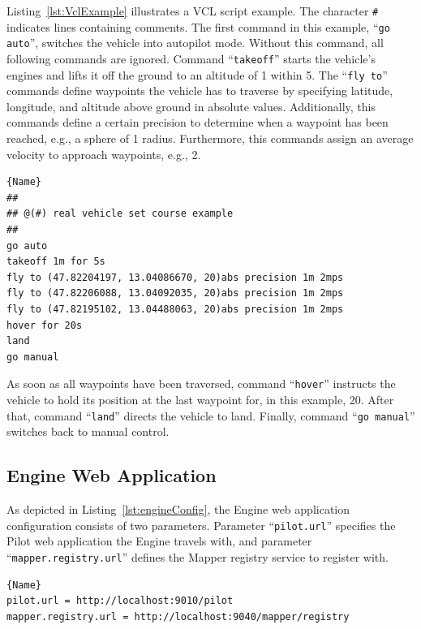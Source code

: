 Listing~\ref{lst:VclExample} illustrates a \ac{VCL} script example. 
The character \texttt{\#} indicates lines containing comments.
%
The first command in this example, ``\texttt{go auto}'', switches the vehicle into autopilot mode. Without
this command, all following commands are ignored. Command ``\texttt{takeoff}'' starts the vehicle's engines
and lifts it off the ground to an altitude of \unit{1}{\meter} within \unit{5}{\second}.
%
The ``\texttt{fly to}'' commands define waypoints the vehicle has to traverse by specifying latitude, longitude,
and altitude above ground in absolute values. Additionally, this commands define a certain precision to
determine when a waypoint has been reached, e.g., a sphere of \unit{1}{\meter} radius. Furthermore, this commands
assign an average velocity to approach waypoints, e.g., \unit{2}{\meter\per\second}.
% 
\lstset{tabsize=3,language=Tex}
\begin{lstlisting}[caption={Vehicle Control Language Example},mathescape=true,label=lst:VclExample]{Name}
##
## @(#) real vehicle set course example
##
go auto
takeoff 1m for 5s
fly to (47.82204197, 13.04086670, 20)abs precision 1m 2mps
fly to (47.82206088, 13.04092035, 20)abs precision 1m 2mps
fly to (47.82195102, 13.04488063, 20)abs precision 1m 2mps
hover for 20s
land
go manual
\end{lstlisting}
%
As soon as all waypoints have been traversed, command ``\texttt{hover}'' instructs the vehicle to hold its
position at the last waypoint for, in this example, \unit{20}{\second}. After that, command ``\texttt{land}''
directs the vehicle to land. Finally, command ``\texttt{go manual}'' switches back to manual control.


\subsection{Engine Web Application}

As depicted in Listing~\ref{lst:engineConfig}, the Engine web application configuration consists
of two parameters. Parameter ``\texttt{pilot.url}'' specifies the Pilot web application the Engine
travels with, and parameter ``\texttt{mapper.registry.url}'' defines the Mapper registry service to
register with.
\lstset{tabsize=3,language=Tex}
\begin{lstlisting}[caption={Engine Configuration Example},mathescape=true,label=lst:engineConfig]{Name}
pilot.url = http://localhost:9010/pilot
mapper.registry.url = http://localhost:9040/mapper/registry
\end{lstlisting}



